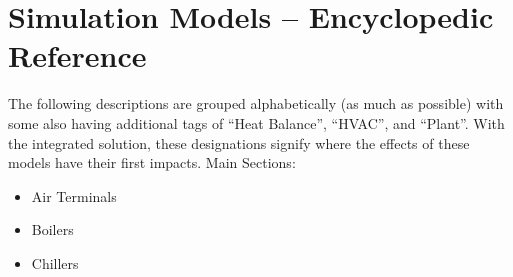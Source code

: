 \chapter{Simulation Models -- Encyclopedic Reference}\label{simulation-models-encyclopedic-reference-001}

The following descriptions are grouped alphabetically (as much as possible) with some also having additional tags of ``Heat Balance'', ``HVAC'', and ``Plant''. With the integrated solution, these designations signify where the effects of these models have their first impacts. Main Sections:

\begin{itemize}
  \item Air Terminals
  \item Boilers
  \item Chillers 
\end{itemize}
